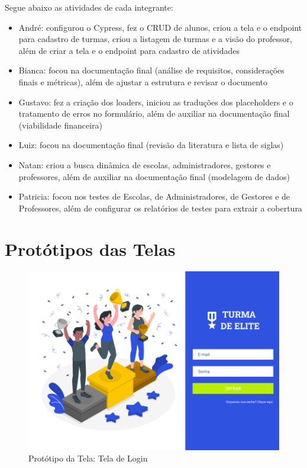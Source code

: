 \documentclass[
    12pt,               %
    openright,          %
    oneside,
    a4paper,            %
    english,            %
    brazil              %
    ]{ifsp-spo-inf-ctds} %
\begin{document}
\begin{apendicesenv}
Segue abaixo as atividades de cada integrante:
\begin{itemize}
\item André: configurou o Cypress, fez o CRUD de alunos, criou a tela e o endpoint para cadastro de turmas, criou a listagem de turmas e a visão do professor, além de criar a tela e o endpoint para cadastro de atividades
\item Bianca: focou na documentação final (análise de requisitos, considerações finais e métricas), além de ajustar a estrutura e revisar o documento 
\item Gustavo: fez a criação dos loaders, iniciou as traduções dos placeholders e o tratamento de erros no formulário, além de auxiliar na documentação final (viabilidade financeira)
\item Luiz: focou na documentação final (revisão da literatura e lista de siglas)
\item Natan: criou a busca dinâmica de escolas, administradores, gestores e professores, além de auxiliar na documentação final (modelagem de dados)
\item Patricia: focou nos testes de Escolas, de Administradores, de Gestores e de Professores, além de configurar os relatórios de testes para extrair a cobertura
\end{itemize}

\chapter{Protótipos das Telas}
\label{prototipos}

\begin{figure}[htb]
    \centering
	\includegraphics[width=16cm]{imagens/Geral-Login.png}
	\caption{\label{fig:login} Protótipo da Tela: Tela de Login}
\end{figure}
\FloatBarrier



\end{apendicesenv}
\end{document}
